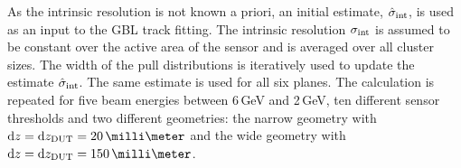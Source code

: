 As the intrinsic resolution is not known a priori, an initial estimate, $\hat{\sigma}_{\textrm{int}}$, is used as an input to the GBL track fitting. 
The intrinsic resolution $\sigma_{\textrm{int}}$ is assumed to be constant over the active area of the sensor and is averaged over all cluster sizes. 
The width of the pull distributions is iteratively used to update the estimate $\hat{\sigma}_{\textrm{int}}$. 
The same estimate is used for all six planes. 
The calculation is repeated for five beam energies between 6\,GeV and 2\,GeV, ten different sensor thresholds
 and two different geometries: the narrow geometry with $\dz = \dzdut = 20\,\milli\meter$ and the wide geometry with $\dz = \dzdut = 150\,\milli\meter$.

